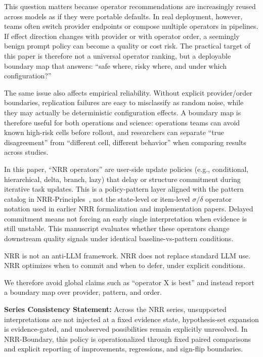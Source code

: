 \documentclass[11pt,a4paper]{article}
\begin{document}
This question matters because operator recommendations are increasingly reused across models as if they were portable defaults. In real deployment, however, teams often switch provider endpoints or compose multiple operators in pipelines. If effect direction changes with provider or with operator order, a seemingly benign prompt policy can become a quality or cost risk. The practical target of this paper is therefore not a universal operator ranking, but a deployable boundary map that answers: ``safe where, risky where, and under which configuration?''

The same issue also affects empirical reliability. Without explicit provider/order boundaries, replication failures are easy to misclassify as random noise, while they may actually be deterministic configuration effects. A boundary map is therefore useful for both operations and science: operations teams can avoid known high-risk cells before rollout, and researchers can separate ``true disagreement'' from ``different cell, different behavior'' when comparing results across studies.

In this paper, ``NRR operators'' are user-side update policies (e.g., conditional, hierarchical, delta, branch, lazy) that delay or structure commitment during iterative task updates. This is a policy-pattern layer aligned with the pattern catalog in NRR-Principles~\cite{saito2026principles}, not the state-level or item-level $\sigma/\delta$ operator notation used in earlier NRR formalization and implementation papers. Delayed commitment means not forcing an early single interpretation when evidence is still unstable. This manuscript evaluates whether these operators change downstream quality signals under identical baseline-vs-pattern conditions.

NRR is not an anti-LLM framework.
NRR does not replace standard LLM use.
NRR optimizes when to commit and when to defer, under explicit conditions.

We therefore avoid global claims such as ``operator X is best'' and instead report a boundary map over provider, pattern, and order.

\textbf{Series Consistency Statement:}
Across the NRR series, unsupported interpretations are not injected at a fixed evidence state, hypothesis-set expansion is evidence-gated, and unobserved possibilities remain explicitly unresolved. In NRR-Boundary, this policy is operationalized through fixed paired comparisons and explicit reporting of improvements, regressions, and sign-flip boundaries.
\end{document}
